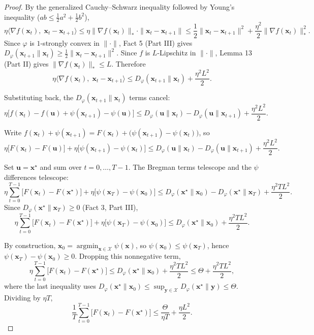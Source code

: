 \begin{proof}
By the generalized Cauchy--Schwarz inequality followed by Young's inequality ($ab \le \tfrac{1}{2}a^2 + \tfrac{1}{2}b^2$),
\[
\eta\langle \nabla f(\mathbf{x}_t),\; \mathbf{x}_t - \mathbf{x}_{t+1}\rangle
\le \eta\|\nabla f(\mathbf{x}_t)\|_* \cdot \|\mathbf{x}_t - \mathbf{x}_{t+1}\|
\le \frac{1}{2}\|\mathbf{x}_t - \mathbf{x}_{t+1}\|^2 + \frac{\eta^2}{2}\|\nabla f(\mathbf{x}_t)\|_*^2.
\]
Since $\varphi$ is $1$-strongly convex in $\|\cdot\|$, Fact 5 (Part III) gives $D_\varphi(\mathbf{x}_{t+1} \| \mathbf{x}_t) \ge \tfrac{1}{2}\|\mathbf{x}_t - \mathbf{x}_{t+1}\|^2$. Since $f$ is $L$-Lipschitz in $\|\cdot\|$, Lemma 13 (Part II) gives $\|\nabla f(\mathbf{x}_t)\|_* \le L$. Therefore
\[
\eta\langle \nabla f(\mathbf{x}_t),\; \mathbf{x}_t - \mathbf{x}_{t+1}\rangle
\le D_\varphi(\mathbf{x}_{t+1} \| \mathbf{x}_t) + \frac{\eta^2 L^2}{2}.
\]

Substituting back, the $D_\varphi(\mathbf{x}_{t+1} \| \mathbf{x}_t)$ terms cancel:
\[
\eta\bigl[f(\mathbf{x}_t) - f(\mathbf{u}) + \psi(\mathbf{x}_{t+1}) - \psi(\mathbf{u})\bigr]
\le D_\varphi(\mathbf{u} \| \mathbf{x}_t) - D_\varphi(\mathbf{u} \| \mathbf{x}_{t+1}) + \frac{\eta^2 L^2}{2}.
\]

Write $f(\mathbf{x}_t) + \psi(\mathbf{x}_{t+1}) = F(\mathbf{x}_t) + \bigl(\psi(\mathbf{x}_{t+1}) - \psi(\mathbf{x}_t)\bigr)$, so
\[
\eta\bigl[F(\mathbf{x}_t) - F(\mathbf{u})\bigr] + \eta\bigl[\psi(\mathbf{x}_{t+1}) - \psi(\mathbf{x}_t)\bigr]
\le D_\varphi(\mathbf{u} \| \mathbf{x}_t) - D_\varphi(\mathbf{u} \| \mathbf{x}_{t+1}) + \frac{\eta^2 L^2}{2}.
\]

Set $\mathbf{u} = \mathbf{x}^\star$ and sum over $t = 0, \dots, T-1$. The Bregman terms telescope and the $\psi$ differences telescope:
\[
\eta\sum_{t=0}^{T-1}\bigl[F(\mathbf{x}_t) - F(\mathbf{x}^\star)\bigr] + \eta\bigl[\psi(\mathbf{x}_T) - \psi(\mathbf{x}_0)\bigr]
\le D_\varphi(\mathbf{x}^\star \| \mathbf{x}_0) - D_\varphi(\mathbf{x}^\star \| \mathbf{x}_T) + \frac{\eta^2 T L^2}{2}.
\]
Since $D_\varphi(\mathbf{x}^\star \| \mathbf{x}_T) \ge 0$ (Fact 3, Part III),
\[
\eta\sum_{t=0}^{T-1}\bigl[F(\mathbf{x}_t) - F(\mathbf{x}^\star)\bigr] + \eta\bigl[\psi(\mathbf{x}_T) - \psi(\mathbf{x}_0)\bigr]
\le D_\varphi(\mathbf{x}^\star \| \mathbf{x}_0) + \frac{\eta^2 T L^2}{2}.
\]

By construction, $\mathbf{x}_0 = \operatorname{argmin}_{\mathbf{x} \in \mathcal{X}} \psi(\mathbf{x})$, so $\psi(\mathbf{x}_0) \le \psi(\mathbf{x}_T)$, hence $\psi(\mathbf{x}_T) - \psi(\mathbf{x}_0) \ge 0$. Dropping this nonnegative term,
\[
\eta\sum_{t=0}^{T-1}\bigl[F(\mathbf{x}_t) - F(\mathbf{x}^\star)\bigr]
\le D_\varphi(\mathbf{x}^\star \| \mathbf{x}_0) + \frac{\eta^2 T L^2}{2}
\le \Theta + \frac{\eta^2 T L^2}{2},
\]
where the last inequality uses $D_\varphi(\mathbf{x}^\star \| \mathbf{x}_0) \le \sup_{\mathbf{y} \in \mathcal{X}} D_\varphi(\mathbf{x}^\star \| \mathbf{y}) \le \Theta$. Dividing by $\eta T$,
\[
\frac{1}{T}\sum_{t=0}^{T-1}\bigl[F(\mathbf{x}_t) - F(\mathbf{x}^\star)\bigr]
\le \frac{\Theta}{\eta T} + \frac{\eta L^2}{2}.
\]


\end{proof}
